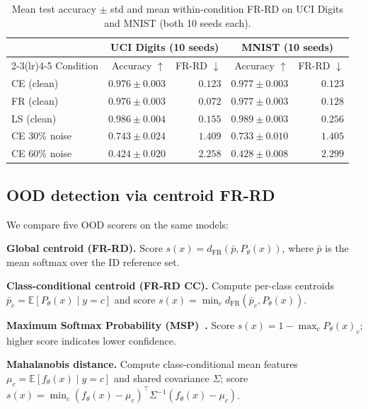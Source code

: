 \documentclass[11pt]{article}
\begin{document}
\begin{table}[t]
  \centering
  \caption{Mean test accuracy $\pm$ std and mean within-condition FR-RD on UCI Digits
  and MNIST (both 10 seeds each).}
  \label{tab:accuracy}
  \scriptsize
  \begin{tabular}{lrrrr}
    \toprule
    & \multicolumn{2}{c}{UCI Digits (10 seeds)} & \multicolumn{2}{c}{MNIST (10 seeds)} \\
    \cmidrule(lr){2-3}\cmidrule(lr){4-5}
    Condition & Accuracy $\uparrow$ & FR-RD $\downarrow$ & Accuracy $\uparrow$ & FR-RD $\downarrow$ \\
    \midrule
    CE (clean)     & $0.976 \pm 0.003$ & $0.123$ & $0.977 \pm 0.003$ & $0.123$ \\
    FR (clean)     & $0.976 \pm 0.003$ & $0.072$ & $0.977 \pm 0.003$ & $0.128$ \\
    LS (clean)     & $0.986 \pm 0.004$ & $0.155$ & $0.989 \pm 0.003$ & $0.256$ \\
    CE 30\% noise  & $0.743 \pm 0.024$ & $1.409$ & $0.733 \pm 0.010$ & $1.405$ \\
    CE 60\% noise  & $0.424 \pm 0.020$ & $2.258$ & $0.428 \pm 0.008$ & $2.299$ \\
    \bottomrule
  \end{tabular}
\end{table}

\subsection{OOD detection via centroid FR-RD}
\label{sec:ood}

We compare five OOD scorers on the same models:

\textbf{Global centroid (FR-RD).} Score $s(x) = d_{\mathrm{FR}}(\bar{p}, P_\theta(x))$,
where $\bar{p}$ is the mean softmax over the ID reference set.

\textbf{Class-conditional centroid (FR-RD CC).} Compute per-class centroids
$\bar{p}_c = \mathbb{E}[P_\theta(x) \mid y = c]$ and score
$s(x) = \min_c d_{\mathrm{FR}}(\bar{p}_c, P_\theta(x))$.

\textbf{Maximum Softmax Probability (MSP)~\citep{hendrycks2017baseline}.}
Score $s(x) = 1 - \max_c P_\theta(x)_c$; higher score indicates lower confidence.

\textbf{Mahalanobis distance.} Compute class-conditional mean features
$\mu_c = \mathbb{E}[f_\theta(x) \mid y=c]$ and shared covariance $\Sigma$; score
$s(x) = \min_c (f_\theta(x)-\mu_c)^\top \Sigma^{-1}(f_\theta(x)-\mu_c)$.
\end{document}
